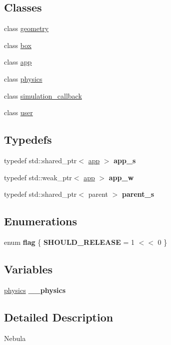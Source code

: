 \subsection*{Classes}
\begin{DoxyCompactItemize}
\item 
class \hyperlink{classneb_1_1geometry}{geometry}
\item 
class \hyperlink{classneb_1_1box}{box}
\item 
class \hyperlink{classneb_1_1app}{app}
\item 
class \hyperlink{classneb_1_1physics}{physics}
\item 
class \hyperlink{classneb_1_1simulation__callback}{simulation\_\-callback}
\item 
class \hyperlink{classneb_1_1user}{user}
\end{DoxyCompactItemize}
\subsection*{Typedefs}
\begin{DoxyCompactItemize}
\item 
\hypertarget{namespaceneb_a1b51fc9e6f1d60fbce949074630087d3}{
typedef std::shared\_\-ptr$<$ \hyperlink{classneb_1_1app}{app} $>$ {\bfseries app\_\-s}}
\label{namespaceneb_a1b51fc9e6f1d60fbce949074630087d3}

\item 
\hypertarget{namespaceneb_ad6e5405bd4d024b280ef795e08b9c950}{
typedef std::weak\_\-ptr$<$ \hyperlink{classneb_1_1app}{app} $>$ {\bfseries app\_\-w}}
\label{namespaceneb_ad6e5405bd4d024b280ef795e08b9c950}

\item 
\hypertarget{namespaceneb_aa0937cb07225b485cc19bbebf2d235ee}{
typedef std::shared\_\-ptr$<$ parent $>$ {\bfseries parent\_\-s}}
\label{namespaceneb_aa0937cb07225b485cc19bbebf2d235ee}

\end{DoxyCompactItemize}
\subsection*{Enumerations}
\begin{DoxyCompactItemize}
\item 
enum {\bfseries flag} \{ {\bfseries SHOULD\_\-RELEASE} =  1 $<$$<$ 0
 \}
\end{DoxyCompactItemize}
\subsection*{Variables}
\begin{DoxyCompactItemize}
\item 
\hypertarget{namespaceneb_a8fdb4f53a66aec6d854ff9b5efd36ed3}{
\hyperlink{classneb_1_1physics}{physics} {\bfseries \_\-\_\-physics}}
\label{namespaceneb_a8fdb4f53a66aec6d854ff9b5efd36ed3}

\end{DoxyCompactItemize}


\subsection{Detailed Description}
Nebula 